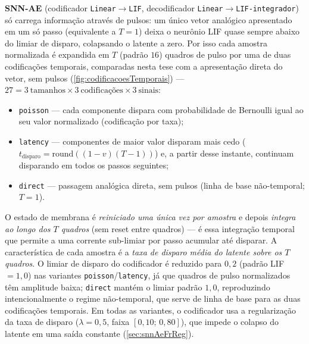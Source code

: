 \textbf{SNN-AE} (codificador \texttt{Linear}$\to$\texttt{LIF}, decodificador \texttt{Linear}$\to$\texttt{LIF-integrador}) só carrega informação através de pulsos: um único vetor analógico apresentado em um só passo (equivalente a $T=1$) deixa o neurônio LIF quase sempre abaixo do limiar de disparo, colapsando o latente a zero. Por isso cada amostra normalizada é expandida em $T$ (padrão $16$) quadros de pulso por uma de duas codificações temporais, comparadas nesta tese com a apresentação direta do vetor, sem pulsos (\autoref{fig:codificacoesTemporais}) --- $27 = 3~\text{tamanhos} \times 3~\text{codificações} \times 3~\text{sinais}$:
\begin{itemize}
	\item \texttt{poisson} --- cada componente dispara com probabilidade de Bernoulli igual ao seu valor normalizado (codificação por taxa);
	\item \texttt{latency} --- componentes de maior valor disparam mais cedo ($t_{\text{disparo}} = \text{round}((1-v)(T-1))$) e, a partir desse instante, continuam disparando em todos os passos seguintes;
	\item \texttt{direct} --- passagem analógica direta, sem pulsos (linha de base não-temporal; $T=1$).
\end{itemize}
O estado de membrana é \emph{reiniciado uma única vez por amostra} e depois \emph{integra ao longo dos $T$ quadros} (sem reset entre quadros) --- é essa integração temporal que permite a uma corrente sub-limiar por passo acumular até disparar. A característica de cada amostra é a \emph{taxa de disparo média do latente sobre os $T$ quadros}. O limiar de disparo do codificador é reduzido para $0{,}2$ (padrão LIF $=1{,}0$) nas variantes \texttt{poisson}/\texttt{latency}, já que quadros de pulso normalizados têm amplitude baixa; \texttt{direct} mantém o limiar padrão $1{,}0$, reproduzindo intencionalmente o regime não-temporal, que serve de linha de base para as duas codificações temporais. Em todas as variantes, o codificador usa a regularização da taxa de disparo ($\lambda=0{,}5$, faixa $[0{,}10;\,0{,}80]$), que impede o colapso do latente em uma saída constante (\autoref{sec:snnAeFrReg}).

